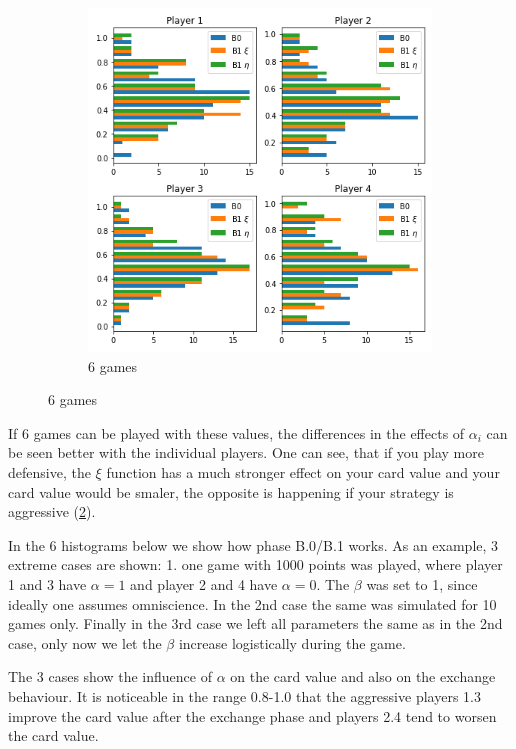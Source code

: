 \begin{figure}[ht]
\begin{subfigure}{0.5\textwidth}
    \includegraphics[width=1\linewidth]{Bilder/example_2}
    \caption{6 games}
    \label{fig:18}
\end{subfigure}
\end{figure}

If 6 games can be played with these values, the differences in the effects of $\alpha_i$ can be seen better with the individual players. One can see, that if you play more defensive, the $\xi$ function has a much stronger effect on your card value and your card value would be smaler, the opposite is happening if your strategy is aggressive (\ref{fig:18}).

In the 6 histograms below we show how phase B.0/B.1 works. As an example, 3 extreme cases are shown: 1. one game with 1000 points was played, where player 1 and 3 have $\alpha = 1$ and player 2 and 4 have $\alpha=0$. The $\beta$ was set to 1, since ideally one assumes omniscience. In the 2nd case the same was simulated for 10 games only. Finally in the 3rd case we left all parameters the same as in the 2nd case, only now we let the $\beta$ increase logistically during the game.

The 3 cases show the influence of $\alpha$ on the card value and also on the exchange behaviour. It is noticeable in the range 0.8-1.0 that the aggressive players 1.3 improve the card value after the exchange phase and players 2.4 tend to worsen the card value.

